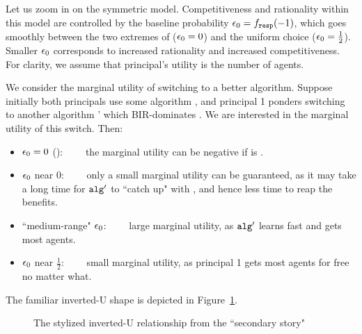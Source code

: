 Let us zoom in on the symmetric  \HardMaxRandom model. {Competitiveness and rationality within this model are controlled by the baseline probability $\epsilon_0 = f_{\mathtt{resp}}(- 1)$, which goes smoothly between the two extremes of \HardMax ($\epsilon_0=0$) and the uniform choice ($\epsilon_0=\tfrac12$). Smaller $\epsilon_0$ corresponds to increased rationality and increased competitiveness.} For clarity, we assume that principal's utility is the number of agents.

We consider the marginal utility of switching to a better algorithm. Suppose initially both principals use some algorithm \alg, and principal 1 ponders switching to another algorithm \alg' which BIR-dominates \alg. {We are interested in the marginal utility of this switch. Then:}

\begin{itemize}
\item $\epsilon_0 = 0$ (\HardMax):~~~~ the marginal utility can be negative if \alg is \DynGreedy.

\item $\epsilon_0$ near $0$:~~~~ only a small marginal utility can be guaranteed, as it may take a long time for $\mathtt{alg}_{}'$ to ``catch up" with \alg, and hence less time to reap the benefits.

\item ``medium-range" $\epsilon_0$:~~~~ large marginal utility, as $\mathtt{alg}_{}'$ learns fast and gets most agents.

\item $\epsilon_0$ near $\tfrac12$:~~~~ small marginal utility, as principal 1 gets most agents for free no matter what.
\end{itemize}
The familiar inverted-U shape is depicted in Figure~\ref{fig:inverted-U3}.



\begin{figure}
\begin{center}

\caption{The stylized inverted-U relationship from the ``secondary story"}
\label{fig:inverted-U3}
\end{center}
\end{figure}








